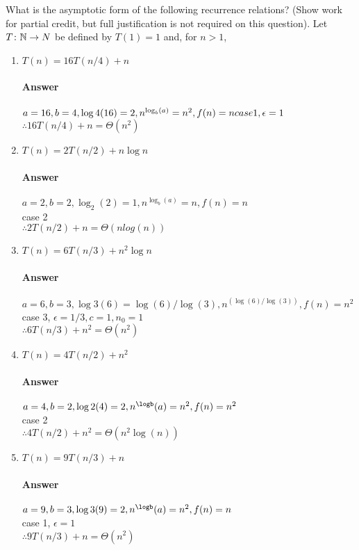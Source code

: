 \documentclass{article}
\begin{document}
What is the asymptotic form of the following recurrence
relations? (Show work for partial credit, but full justification is not required
on this question).
Let $T \colon {\mathbb N} \to N$ be defined by $T(1)=1$ and, for $n>1$,
\begin{enumerate}
    \item $T(n) = 16 T(n/4) + n$
        \paragraph{Answer} {$a=16,b=4, \log4(16)=2,n^{\log_b(a)} = n^2,f (n)=n\\
        case 1, \epsilon=1$  \\
        $\therefore 16T(n/4) + n =\Theta(n^2)$}
    \item $T(n) = 2 T(n/2) + n \log{n}$
        \paragraph{Answer} {$a=2,b=2, \log_2(2)=1,n^{\log_b(a)}=n,f(n)=n$\\
        case 2 \\
        $\therefore 2 T(n/2) + n = \Theta(nlog(n))$}
    \item $T(n) = 6 T(n/3) + n^2 \log{n}$
        \paragraph{Answer} {$a=6,b=3,\log3(6)=\log(6)/\log(3),n^(\log(6)/\log(3)),f(n)=n^2$ \\
        case 3, $\epsilon=1/3, c=1,  n_{0}=1$ \\
        $\therefore 6 T(n/3) + n^2 = \Theta(n^2) $}
    \item $T(n) = 4 T(n/2) + n^2$
        \paragraph{Answer} {$a=4,b=2,\log2(4)=2,n ^ \logb(a) =n^2,f(n)=n^2$ \\
        case 2 \\
        $\therefore 4 T(n/2) + n^2 = \Theta(n^2\log(n))$}
    \item $T(n) = 9 T(n/3) + n$
        \paragraph{Answer} {$a=9,b=3,\log3(9)=2,n ^  \logb(a) = n^2, f(n) = n$ \\
        case 1, $\epsilon=1$ \\
        $\therefore 9 T(n/3) + n = \Theta(n^2)$}
\end{enumerate}
\end{document}
